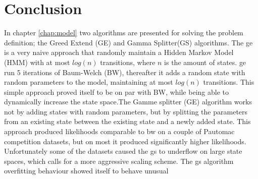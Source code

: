 \chapter{Conclusion}

In chapter \ref{chap:model} two algorithms are presented for solving the problem definition; the Greed Extend (GE) and Gamma Splitter(GS) algorithms. The \gls{ge} is a very naive approach that randomly maintain a Hidden Markov Model (HMM) with at most $log(n)$ transitions, where $n$ is the amount of states. \gls{ge} run 5 iterations of Baum-Welch (BW), thereafter it adds a random state with random parameters to the model, maintaining at most $log(n)$ transitions. This simple approach proved itself to be on par with BW, while being able to dynamically increase the state space.The Gamme splitter (GE) algorithm works not by adding states with random parameters, but by splitting the parameters from an existing state between the existing state and a newly added state. This approach produced likelihoods comparable to \gls{bw} on a couple of Pautomac competition datasets, but on most it produced significantly higher likelihoods. Unfortunately some of the datasets caused the \gls{gs} to underflow on large state spaces, which calls for a more aggressive scaling scheme.
The \gls{gs} algorithm overfitting behaviour showed itself to behave unusual